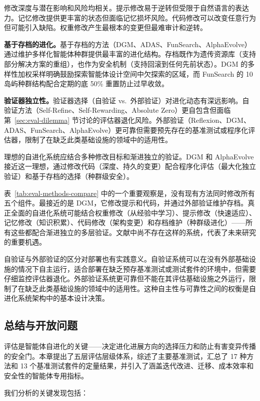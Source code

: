 修改深度与潜在影响和风险均相关。提示修改易于逆转但受限于自然语言的表达力。记忆修改提供更丰富的状态但面临记忆损坏风险。代码修改可以改变任意行为但可能引入缺陷。权重修改产生最根本的变更但最难审计和逆转。

\textbf{基于存档的进化。}基于存档的方法（DGM、ADAS、FunSearch、AlphaEvolve）通过维护多样化智能体种群提供最丰富的进化结构。存档既作为遗传资源库（支持部分解决方案的重组），也作为安全机制（支持回滚到任何先前状态）。DGM 的多样性加权采样明确鼓励探索智能体设计空间中欠探索的区域，而 FunSearch 的 10 岛屿种群结构配合定期的底 50\% 重置防止过早收敛。

\textbf{验证器独立性。}验证器选择（自验证 vs.\ 外部验证）对进化动态有深远影响。自验证方法（Self-Refine、Self-Rewarding、Absolute Zero）更自包含但面临第~\ref{sec:eval-dilemma} 节讨论的评估器退化风险。外部验证（Reflexion、DGM、ADAS、FunSearch、AlphaEvolve）更可靠但需要预先存在的基准测试或程序化评估器，限制了在缺乏此类基础设施的领域中的适用性。

理想的自进化系统应结合多种修改目标和渐进独立的验证。DGM 和 AlphaEvolve 接近这一理想，通过修改代码（深度、持久的变更）配合程序化评估（最大化独立验证）和基于存档的选择（种群级安全）。

表~\ref{tab:eval-methods-compare} 中的一个重要观察是，没有现有方法同时修改所有五个组件。最接近的是 DGM，它修改提示和代码，并通过外部验证维护存档。真正全面的自进化系统可能结合权重修改（从经验中学习）、提示修改（快速适应）、记忆修改（知识积累）、代码修改（架构变更）和存档维护（种群级进化）——所有这些都配合渐进独立的多层验证。文献中尚不存在这样的系统，代表了未来研究的重要机遇。

自验证与外部验证的区分对部署也有实践意义。自验证系统可以在没有外部基础设施的情况下自主运行，适合部署在缺乏预存基准测试或测试套件的环境中，但需要仔细监控评估器退化。外部验证系统更可靠但不能在其评估基础设施之外运行，限制了在缺乏此类基础设施的领域中的适用性。这种自主性与可靠性之间的权衡是自进化系统架构中的基本设计决策。


\subsection{总结与开放问题}
\label{sec:eval-summary}

评估是智能体自进化的关键——决定进化进展方向的选择压力和防止有害变异传播的安全门。本章提出了五层评估层级体系，综述了主要基准测试，汇总了 17 种方法和 13 个基准测试套件的定量结果，并引入了涵盖迭代改进、迁移、成本效率和安全性的智能体专用指标。

我们分析的关键发现包括：

